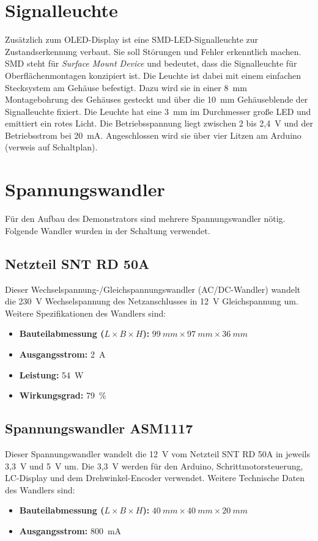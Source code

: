 \section{Signalleuchte}
Zusätzlich zum OLED-Display ist eine SMD-LED-Signalleuchte zur Zustandserkennung verbaut. Sie soll Störungen und Fehler erkenntlich machen. SMD steht für \emph{Surface Mount Device} und bedeutet, dass die Signalleuchte für Oberflächenmontagen konzipiert ist. Die Leuchte ist dabei mit einem einfachen Stecksystem am Gehäuse befestigt. Dazu wird sie in einer 8\ mm Montagebohrung des Gehäuses gesteckt und über die 10\ mm Gehäuseblende der Signalleuchte fixiert. Die Leuchte hat eine 3\ mm im Durchmesser große LED und emittiert ein rotes Licht. Die Betriebsspannung liegt zwischen 2 bis 2,4\ V und der Betriebsstrom bei 20\ mA. Angeschlossen wird sie über vier Litzen am Arduino (verweis auf Schaltplan).\cite{Mentor.2024}

\section{Spannungswandler}
Für den Aufbau des Demonstrators sind mehrere Spannungswandler nötig. Folgende Wandler wurden in der Schaltung verwendet.
\subsection{Netzteil SNT RD 50A}
Dieser Wechselspannung-/Gleichspannungswandler (AC/DC-Wandler) wandelt die 230\ V Wechselspannung des Netzanschlusses in 12\ V Gleichspannung um. %
Weitere Spezifikationen des Wandlers sind:
\begin{itemize}
	\item \textbf{Bauteilabmessung ($L\times B \times H$):} $99 \ mm \times 97 \ mm \times 36 \ mm$
	\item \textbf{Ausgangsstrom:} 2\ A
	\item \textbf{Leistung:} 54\ W
	\item \textbf{Wirkungsgrad:} 79\ \% 
\end{itemize} 
\cite{Meanwell.2019}

\subsection{Spannungswandler ASM1117}
Dieser Spannungswandler wandelt die 12\ V vom Netzteil SNT RD 50A in jeweils 3,3\ V und 5\ V um. Die 3,3\ V werden für den Arduino, Schrittmotorsteuerung, LC-Display und dem Drehwinkel-Encoder verwendet. Weitere Technische Daten des Wandlers sind:
\begin{itemize}
	\item \textbf{Bauteilabmessung ($L\times B \times H$):} $40 \ mm \times 40 \ mm \times 20 \ mm$
	\item \textbf{Ausgangsstrom:} 800\ mA
\end{itemize}
	\cite{AMS}
	

